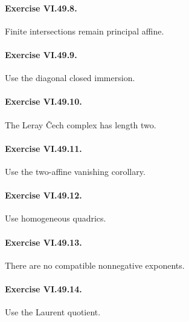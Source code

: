 \paragraph{Exercise VI.49.8.}
\begin{hint}
Finite intersections remain principal affine.
\end{hint}

\paragraph{Exercise VI.49.9.}
\begin{hint}
Use the diagonal closed immersion.
\end{hint}

\paragraph{Exercise VI.49.10.}
\begin{hint}
The Leray Čech complex has length two.
\end{hint}

\paragraph{Exercise VI.49.11.}
\begin{hint}
Use the two-affine vanishing corollary.
\end{hint}

\paragraph{Exercise VI.49.12.}
\begin{hint}
Use homogeneous quadrics.
\end{hint}

\paragraph{Exercise VI.49.13.}
\begin{hint}
There are no compatible nonnegative exponents.
\end{hint}

\paragraph{Exercise VI.49.14.}
\begin{hint}
Use the Laurent quotient.
\end{hint}

